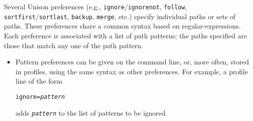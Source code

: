 \documentclass{article}
\newcommand{\ARG}[1]{\texttt{\textit{#1}}}
\begin{document}
Several Unison preferences (e.g., \verb|ignore|/\verb|ignorenot|,
\verb|follow|, \verb|sortfirst|/\verb|sortlast|, \verb|backup|,
\verb|merge|, etc.)
specify individual paths or sets of paths.  These preferences share a
common syntax based on regular-expressions.  Each preference
is associated with a list of path patterns; the paths specified are those
that match any one of the path pattern.

\begin{itemize}
\item Pattern preferences can be given on the command line,
  or, more often, stored in profiles, using the same syntax as other preferences.
  For example, a profile line of the form
\begin{alltt}
             ignore = \ARG{pattern}
\end{alltt}
adds \ARG{pattern} to the list of patterns to be ignored.


\end{itemize}
\end{document}

